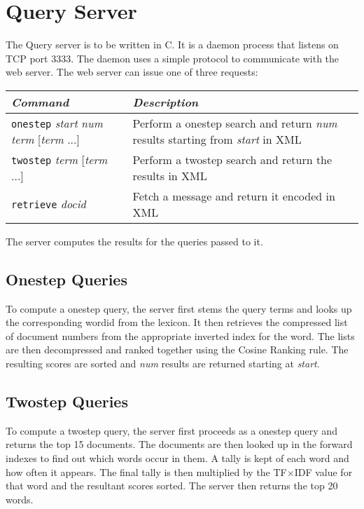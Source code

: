 \section{Query Server}
\label{sec:qs}
The Query server is to be written in C.  It is a daemon process that listens on TCP port 3333.  The daemon uses a simple protocol to communicate with the web server.  The web server can issue one of three requests:

\begin{center}
\begin{tabular}{l|p{7cm}}
\emph{Command}  &  \emph{Description} \\
\hline
\texttt{onestep} \emph{start} \emph{num} \emph{term} [\emph{term} ...] & Perform a onestep search and return \emph{num} results starting from \emph{start} in XML \\
\texttt{twostep} \emph{term} [\emph{term} ...] & Perform a twostep search and return the results in XML \\
\texttt{retrieve} \emph{docid} & Fetch a message and return it encoded in XML \\
\end{tabular}
\end{center}

The server computes the results for the queries passed to it.

\subsection{Onestep Queries}
To compute a onestep query, the server first stems the query terms and looks up the corresponding wordid from the lexicon.  It then retrieves the compressed list of document numbers from the appropriate inverted index for the word.  The lists are then decompressed and ranked together using the Cosine Ranking rule.  The resulting scores are sorted and \emph{num} results are returned starting at \emph{start}.

\subsection{Twostep Queries}
To compute a twostep query, the server first proceeds as a onestep query and returns the top 15 documents.  The documents are then looked up in the forward indexes to find out which words occur in them.  A tally is kept of each word and how often it appears.  The final tally is then multiplied by the TF$\times$IDF value for that word and the resultant scores sorted.  The server then returns the top 20 words.


